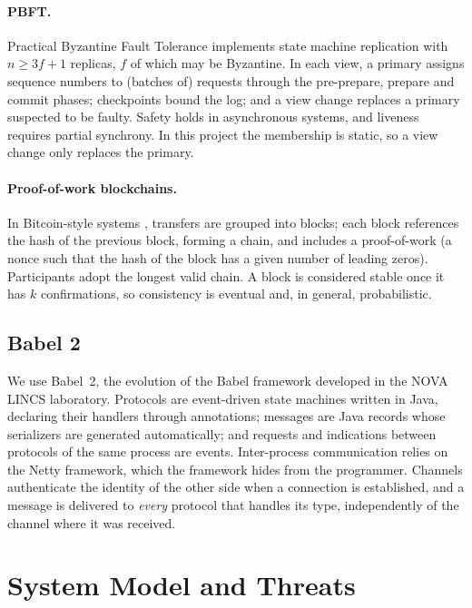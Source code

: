 \documentclass[sigconf,a4paper]{acmart}
\begin{document}
    \paragraph{PBFT.} Practical Byzantine Fault Tolerance
    \cite{practical-byzantine-fault-tolerance} implements state machine
    replication with $n \ge 3f+1$ replicas, $f$ of which may be Byzantine. In each
    view, a primary assigns sequence numbers to (batches of) requests through the
    pre-prepare, prepare and commit phases; checkpoints bound the log; and a view
    change replaces a primary suspected to be faulty. Safety holds in asynchronous
    systems, and liveness requires partial synchrony. In this project the
    membership is static, so a view change only replaces the primary.

    \paragraph{Proof-of-work blockchains.} In Bitcoin-style systems
    \cite{bitcoin}, transfers are grouped into blocks; each block references the
    hash of the previous block, forming a chain, and includes a proof-of-work (a
    nonce such that the hash of the block has a given number of leading zeros).
    Participants adopt the longest valid chain. A block is considered stable once
    it has $k$ confirmations, so consistency is eventual and, in general,
    probabilistic.

    \subsection{Babel 2}

    We use Babel~2, the evolution of the Babel framework \cite{babel_framework}
    developed in the NOVA LINCS laboratory. Protocols are event-driven state
    machines written in Java, declaring their handlers through annotations;
    messages are Java records whose serializers are generated automatically; and
    requests and indications between protocols of the same process are events.
    Inter-process communication relies on the Netty framework, which the
    framework hides from the programmer. Channels authenticate the identity of the
    other side when a connection is established, and a message is delivered to
    \emph{every} protocol that handles its type, independently of the channel
    where it was received.

    \section{System Model and Threats}
    \label{sec:model}
\end{document}

